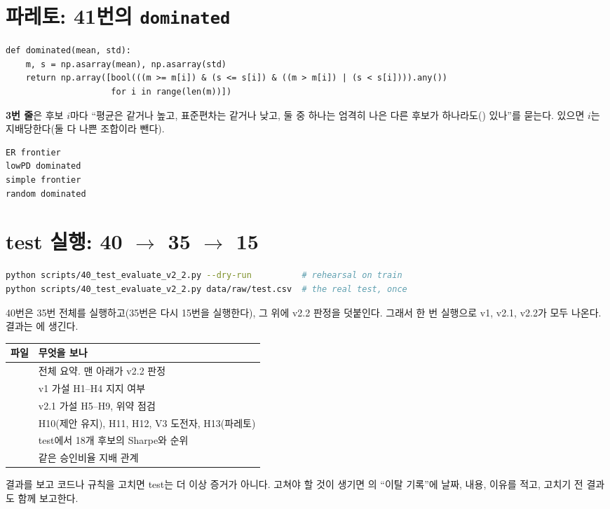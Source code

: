 \section{파레토: 41번의 \texttt{dominated}}
\begin{lstlisting}
def dominated(mean, std):
    m, s = np.asarray(mean), np.asarray(std)
    return np.array([bool(((m >= m[i]) & (s <= s[i]) & ((m > m[i]) | (s < s[i]))).any())
                     for i in range(len(m))])
\end{lstlisting}
\textbf{3번 줄}은 후보 $i$마다 ``평균은 같거나 높고, 표준편차는 같거나 낮고, 둘 중 하나는 엄격히 나은 다른 후보가 하나라도() 있나''를 묻는다. 있으면 $i$는 지배당한다(둘 다 나쁜 조합이라 뺀다).
\begin{workout}
\begin{lstlisting}[style=out]
ER frontier
lowPD dominated
simple frontier
random dominated
\end{lstlisting}
\end{workout}

\section{test 실행: 40 \ensuremath{\to} 35 \ensuremath{\to} 15}
\begin{lstlisting}[language=bash,numbers=none]
python scripts/40_test_evaluate_v2_2.py --dry-run          # rehearsal on train
python scripts/40_test_evaluate_v2_2.py data/raw/test.csv  # the real test, once
\end{lstlisting}
40번은 35번 전체를 실행하고(35번은 다시 15번을 실행한다), 그 위에 v2.2 판정을 덧붙인다. 그래서 한 번 실행으로 v1, v2.1, v2.2가 모두 나온다. 결과는 에 생긴다.
\begin{table}[H]\centering\small
\begin{tabularx}{\linewidth}{@{}p{45mm}L@{}}\toprule
파일 & 무엇을 보나\\\midrule
{} & 전체 요약. 맨 아래가 v2.2 판정\\
 & v1 가설 H1--H4 지지 여부\\
 & v2.1 가설 H5--H9, 위약 점검\\
 & H10(제안 유지), H11, H12, V3 도전자, H13(파레토)\\
 & test에서 18개 후보의 Sharpe와 순위\\
 & 같은 승인비율 지배 관계\\\bottomrule
\end{tabularx}
\end{table}
\begin{warnbox}[test는 한 번만]
결과를 보고 코드나 규칙을 고치면 test는 더 이상 증거가 아니다. 고쳐야 할 것이 생기면 의 ``이탈 기록''에 날짜, 내용, 이유를 적고, 고치기 전 결과도 함께 보고한다.
\end{warnbox}

